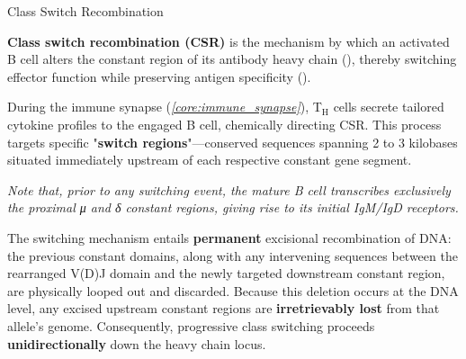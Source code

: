       \begin{core}[label=core:csr]{Class Switch Recombination}

        \textbf{Class switch recombination (CSR)} is the mechanism by which an activated B cell alters the constant region of its antibody heavy chain (), thereby switching effector function while preserving antigen specificity ().

        During the immune synapse (\textit{\autoref{core:immune_synapse}}), T$_\text{H}$ cells secrete tailored cytokine profiles to the engaged B cell, chemically directing CSR. This process targets specific "\textbf{switch regions}"---conserved sequences spanning 2 to 3 kilobases situated immediately upstream of each respective constant gene segment.


        \textit{Note that, prior to any switching event, the mature B cell transcribes exclusively the proximal μ and δ constant regions, giving rise to its initial IgM/IgD receptors.}

        The switching mechanism entails \textbf{permanent} excisional recombination of DNA: the previous constant domains, along with any intervening sequences between the rearranged V(D)J domain and the newly targeted downstream constant region, are physically looped out and discarded. Because this deletion occurs at the DNA level, any excised upstream constant regions are \textbf{irretrievably lost} from that allele's genome. Consequently, progressive class switching proceeds \textbf{unidirectionally} down the heavy chain locus.


\end{core}
